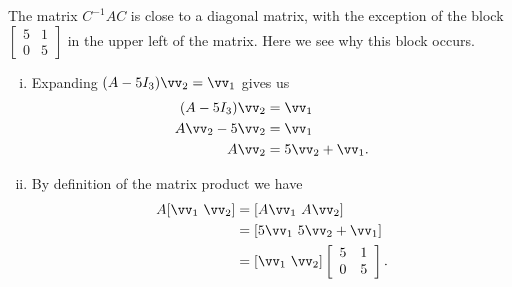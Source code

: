 \item The matrix $C^{-1}AC$ is close to a diagonal matrix, with the exception of the block $\left[ \begin{array}{cc} 5&1 \\ 0&5 \end{array} \right]$ in the upper left of the matrix. Here we see why this block occurs. 
	\begin{enumerate}[i.]
	\item  Expanding $(A - 5 I_3) \vv_2 = \vv_1$ gives us 
\begin{align*}
(A - 5 I_3) \vv_2 &= \vv_1 \\
A\vv_2 - 5 \vv_2 &= \vv_1 \\
A\vv_2 &= 5\vv_2 + \vv_1.
\end{align*}

	\item  By definition of the matrix product we have 
\begin{align*}
A [\vv_1 \ \vv_2] &= [A\vv_1 \ A\vv_2] \\
	&= [5 \vv_1 \ 5 \vv_2+\vv_1 ] \\
	&= [\vv_1  \ \vv_2]  \left[ \begin{array}{ccc} 5 &1 \\ 0 & 5  \end{array} \right].
\end{align*}
	
	\end{enumerate}
	

\ea


